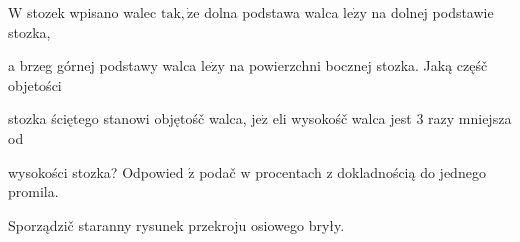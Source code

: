 \documentclass[a4paper,12pt]{article}
\begin{document}
$\mathrm{W}$ stozek wpisano walec $\mathrm{t}\mathrm{a}\mathrm{k}, \dot{\mathrm{z}}\mathrm{e}$ dolna podstawa walca $\mathrm{l}\mathrm{e}\dot{\mathrm{z}}\mathrm{y}$ na dolnej podstawie stozka,

a brzeg górnej podstawy walca $\mathrm{l}\mathrm{e}\dot{\mathrm{z}}\mathrm{y}$ na powierzchni bocznej stozka. Jaką częśč objetości

stozka ściętego stanowi objętośč walca, $\mathrm{j}\mathrm{e}\dot{\mathrm{z}}$ eli wysokośč walca jest 3 razy mniejsza od

wysokości stozka? Odpowied $\acute{\mathrm{z}}$ podač $\mathrm{w}$ procentach $\mathrm{z}$ dokladnością do jednego promila.

Sporządzič staranny rysunek przekroju osiowego bryły.
\end{document}
